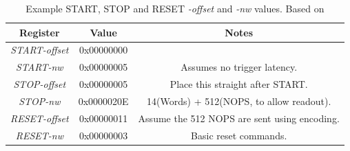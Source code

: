 \documentclass[]{report}
\begin{document}
    \begin{table}
        \begin{center}
        \begin{tabular}{c | c | c}
            Register            & Value      & Notes                                       \\
            \hline
            \emph{START-offset} & 0x00000000 &                                             \\
            \emph{START-nw} & 0x00000005 & Assumes no trigger latency.                 \\
            \emph{STOP-offset}  & 0x00000005 & Place this straight after START.            \\
            \emph{STOP-nw}  & 0x0000020E & 14(Words) + 512(NOPS, to allow readout).    \\
            \emph{RESET-offset} & 0x00000011 & Assume the 512 NOPS are sent using encoding.\\
            \emph{RESET-nw} & 0x00000003 & Basic reset commands.                       \\
        \end{tabular}
        \end{center}
        \caption{Example START, STOP and RESET \emph{-offset} and \emph{-nw} values. Based on \cite{LPD MANUAL}}
        \label{tab:basic_tx_control_reg}
    \end{table}

\end{document}
